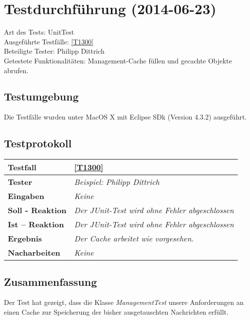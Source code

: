 
\chapter{Testdurchführung (2014-06-23)}

Art des Tests: UnitTest\\
Ausgeführte Testfälle: \ref{T1300}\\ 
Beteiligte Tester: Philipp Dittrich\\
Getestete Funktionalitäten: Management-Cache füllen und gecachte Objekte
abrufen.

\section{Testumgebung}

Die Testfälle wurden unter MacOS X mit Eclipse SDk (Version 4.3.2) ausgeführt.

\section{Testprotokoll}

\begin{longtable}{|p{4cm}|p{11cm}|}
\hline
\textbf{Testfall} & \ref{T1300} \\
\hline
\textbf{Tester} & \textit{Beispiel: Philipp Dittrich} \\
\hline
\textbf{Eingaben} & \textit{Keine} \\
\hline
\textbf{Soll - Reaktion} & \textit{Der JUnit-Test wird ohne Fehler
abgeschlossen }
\\
\hline
\textbf{Ist -- Reaktion} & \textit{Der JUnit-Test wird ohne Fehler
abgeschlossen}
\\
\hline
\textbf{Ergebnis} & \textit{Der Cache arbeitet wie vorgesehen.} \\
\hline
\textbf{Nacharbeiten } & \textit{Keine} \\
\hline
\end{longtable}

\section{Zusammenfassung}

Der Test hat gezeigt, dass die Klasse \textit{ManagementTest} unsere
Anforderungen an einen Cache zur Speicherung der bisher ausgetauschten
Nachrichten erfüllt.
